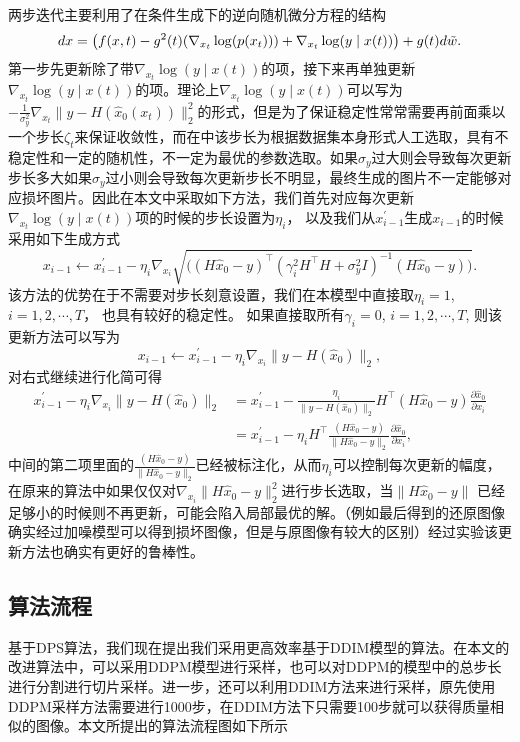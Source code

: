 两步迭代主要利用了在条件生成下的逆向随机微分方程的结构
\begin{equation}
    dx = \left(f(x,t) - g^2(t)(\nabla_{x_t}\log(p(x_t)))+ \nabla_{x_t}\log(y\mid x(t))\right)+g(t)d\Tilde{w}.
\end{equation}
第一步先更新除了带$\nabla_{x_t}\log(y\mid x(t))$的项，接下来再单独更新$\nabla_{x_t}\log(y\mid x(t))$的项。理论上$\nabla_{x_t}\log(y\mid x(t))$可以写为$-\frac{1}{\sigma_y^2}\nabla_{x_t}\|y-H(\hat{x}_0(x_t))\|_2^2$的形式，但是为了保证稳定性常常需要再前面乘以一个步长$\zeta_t$来保证收敛性，而在\cite{Inverse}中该步长为根据数据集本身形式人工选取，具有不稳定性和一定的随机性，不一定为最优的参数选取。如果$\sigma_y$过大则会导致每次更新步长多大如果$\sigma_y$过小则会导致每次更新步长不明显，最终生成的图片不一定能够对应损坏图片。因此在本文中采取如下方法，我们首先对应每次更新$\nabla_{x_t}\log(y\mid x(t))$项的时候的步长设置为$\eta_i$， 以及我们从$x_{i-1}^{\prime}$生成$x_{i-1}$的时候采用如下生成方式
\begin{equation}
    x_{i-1} \xleftarrow{} x_{i-1}^{\prime} - \eta_i \nabla_{x_i}\sqrt{((H\hat{x}_0-y)^{\top}\left(\gamma_i^2 H^{\top}H + \sigma_y^2 I\right)^{-1}(H\hat{x}_0-y)\bigg)}.
\end{equation}
该方法的优势在于不需要对步长刻意设置，我们在本模型中直接取$\eta_i=1$, $i=1,2,\cdots,T$， 也具有较好的稳定性。 如果直接取所有$\gamma_i=0$, $i=1,2,\cdots, T$, 则该更新方法可以写为
\begin{equation}
       x_{i-1} \xleftarrow{} x_{i-1}^{\prime} - \eta_i \nabla_{x_i}\|y-H(\hat{x}_0)\|_2,
\end{equation}
对右式继续进行化简可得
\begin{align}
    x_{i-1}^{\prime} - \eta_i \nabla_{x_i}\|y-H(\hat{x}_0)\|_2 &=  x_{i-1}^{\prime} - \frac{\eta_i}{\|y-H(\hat{x}_0)\|_2} H^{\top}(H\hat{x}_0-y)\frac{\partial \hat{x}_0}{\partial x_i}\\
    & = x_{i-1}^{\prime} - {\eta_i} H^{\top}\frac{(H\hat{x}_0-y)}{\|H\hat{x}_0-y\|_2}\frac{\partial \hat{x}_0}{\partial x_i},
\end{align}
中间的第二项里面的$\frac{(H\hat{x}_0-y)}{\|H\hat{x}_0-y\|_2}$已经被标注化，从而$\eta_i$可以控制每次更新的幅度，在原来的算法中如果仅仅对$\nabla_{x_i}\|H\hat{x}_0-y\|_2^2$进行步长选取，当$\|H\hat{x}_0-y\|$ 已经足够小的时候则不再更新，可能会陷入局部最优的解。（例如最后得到的还原图像确实经过加噪模型可以得到损坏图像，但是与原图像有较大的区别）经过实验该更新方法也确实有更好的鲁棒性。 

\subsection{算法流程}
基于DPS算法，我们现在提出我们采用更高效率基于DDIM模型的算法。在本文的改进算法中，可以采用DDPM模型进行采样，也可以对DDPM的模型中的总步长进行分割进行切片采样。进一步，还可以利用DDIM方法来进行采样，原先使用DDPM采样方法需要进行1000步，在DDIM方法下只需要100步就可以获得质量相似的图像。本文所提出的算法流程图如下所示

